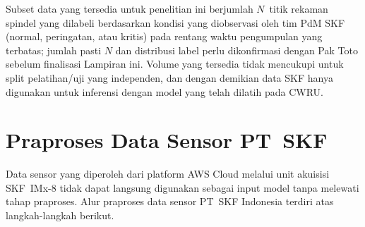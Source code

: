 Subset data yang tersedia untuk penelitian ini berjumlah
$N$~titik rekaman spindel yang dilabeli berdasarkan kondisi yang
diobservasi oleh tim PdM SKF (normal, peringatan, atau kritis)
pada rentang waktu pengumpulan yang terbatas; jumlah pasti $N$
dan distribusi label perlu dikonfirmasi dengan Pak Toto sebelum
finalisasi Lampiran ini. Volume yang tersedia tidak mencukupi
untuk split pelatihan/uji yang independen, dan dengan demikian
data SKF hanya digunakan untuk inferensi dengan model yang telah
dilatih pada CWRU.

\section{{\color{blue}Praproses Data Sensor PT~SKF}}
\label{lamp:skf_praproses}

{\color{blue}Data sensor yang diperoleh dari platform AWS Cloud melalui unit akuisisi
SKF~IMx-8 tidak dapat langsung digunakan sebagai input model tanpa melewati
tahap praproses. Alur praproses data sensor PT~SKF Indonesia terdiri atas
langkah-langkah berikut.}

